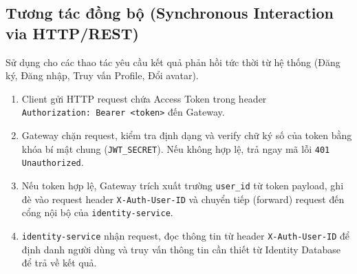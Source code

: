 \documentclass[14pt,a4paper,oneside]{extreport}
\begin{document}
\subsection{Tương tác đồng bộ (Synchronous Interaction via HTTP/REST)}
Sử dụng cho các thao tác yêu cầu kết quả phản hồi tức thời từ hệ thống (Đăng ký, Đăng nhập, Truy vấn Profile, Đổi avatar).
\begin{enumerate}[leftmargin=1.5cm]
  \item Client gửi HTTP request chứa Access Token trong header \texttt{Authorization:\allowbreak\ Bearer\allowbreak\ <token>} đến Gateway.
  \item Gateway chặn request, kiểm tra định dạng và verify chữ ký số của token bằng khóa bí mật chung (\texttt{JWT\_SECRET}). Nếu không hợp lệ, trả ngay mã lỗi \texttt{401 Unauthorized}.
  \item Nếu token hợp lệ, Gateway trích xuất trường \texttt{user\allowbreak\_id} từ token payload, ghi đè vào request header \texttt{X-Auth-\allowbreak User-ID} và chuyển tiếp (forward) request đến cổng nội bộ của \texttt{identity-\allowbreak service}.
  \item \texttt{identity-\allowbreak service} nhận request, đọc thông tin từ header \texttt{X-Auth-\allowbreak User-ID} để định danh người dùng và truy vấn thông tin cần thiết từ Identity Database để trả về kết quả.
\end{enumerate}
\end{document}
